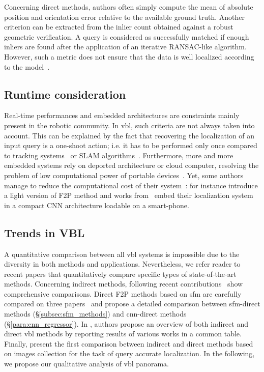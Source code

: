 			Concerning direct methods, authors often simply compute the mean of absolute position and orientation error relative to the available ground truth. Another criterion can be extracted from the inlier count obtained against a robust geometric verification. A query is considered as successfully matched if enough inliers are found after the application of an iterative RANSAC-like algorithm. However, such a metric does not ensure that the data is well localized according to the model~\citep{Sattler2015}.
			
	\subsection{Runtime consideration}
		\label{subsec:runtime}
		Real-time performances and embedded architectures are constraints mainly present in the robotic community. In \ac{vbl}, such criteria are not always taken into account. This can be explained by the fact that recovering the localization of an input query is a one-shoot action; i.e. it has to be performed only once compared to tracking systems~\citep{Marchand2016} or SLAM algorithms~\citep{Garcia-Fidalgo2015}. Furthermore, more and more embedded systems rely on deported architecture or cloud computer, resolving the problem of low computational power of portable devices~\citep{Middelberg2014}. Yet, some authors manage to reduce the computational cost of their system~\citep{Shotton2013,Glocker2015,Lynen2015}: for instance \citet{Feng2016a} introduce a light version of F2P method and works from~\citep{Weyand2016,Kendall2015,Contreras2017} embed their localization system in a compact CNN architecture loadable on a smart-phone.
			
	\subsection{Trends in VBL}
		\label{subsec:qualitative_comparison}
    	
		A quantitative comparison between all \ac{vbl} systems is impossible due to the diversity in both methods and applications. Nevertheless, we refer reader to recent papers that quantitatively compare specific types of state-of-the-art methods. Concerning indirect methods, following recent contributions~\citep{Radenovic2016,Gordo2016} show comprehensive comparisons. Direct F2P methods based on \ac{sfm} are carefully compared on three papers~\citep{Feng2016a,Sattler2016a,Svarm2016} and \citet{Kendall2017} propose a detailed comparison between \ac{sfm}-direct methods (\S\ref{subsec:sfm_methods}) and \ac{cnn}-direct methods (\S\ref{para:cnn_regressor}). In \citep{Brejcha2017}, authors propose an overview of both indirect and direct \ac{vbl} methods by reporting results of various works in a common table. Finally, \citet{Sattler2017} present the first comparison between indirect and direct methods based on images collection for the task of query accurate localization. In the following, we propose our qualitative analysis of \ac{vbl} panorama. 
        

